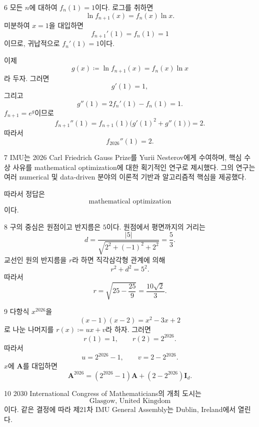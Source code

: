 \documentclass[11pt,oneside]{article}
\begin{document}
\begin{problemsolution}{6}
모든 $n$에 대하여 $f_n(1)=1$이다. 로그를 취하면
\[
    \ln f_{n+1}(x)=f_n(x)\ln x.
\]
미분하여 $x=1$을 대입하면
\[
    f_{n+1}'(1)=f_n(1)=1
\]
이므로, 귀납적으로 $f_n'(1)=1$이다.

이제
\[
    g(x)\coloneqq \ln f_{n+1}(x)=f_n(x)\ln x
\]
라 두자. 그러면
\[
    g'(1)=1,
\]
그리고
\[
    g''(1)
    =
    2f_n'(1)-f_n(1)
    =1.
\]
$f_{n+1}=e^g$이므로
\[
    f_{n+1}''(1)
    =
    f_{n+1}(1)\bigl(g'(1)^2+g''(1)\bigr)
    =2.
\]
따라서
\[
    \boxed{f_{2026}''(1)=2}.
\]
\end{problemsolution}

\begin{problemsolution}{7}
IMU는 2026 Carl Friedrich Gauss Prize를 Yurii Nesterov에게 수여하며, 핵심 수상 사유를 mathematical optimization에 대한 획기적인 연구로 제시했다. 그의 연구는 여러 numerical 및 data-driven 분야의 이론적 기반과 알고리즘적 핵심을 제공했다.

따라서 정답은
\[
    \boxed{\text{mathematical optimization}}
\]
이다.
\end{problemsolution}

\begin{problemsolution}{8}
구의 중심은 원점이고 반지름은 $5$이다. 원점에서 평면까지의 거리는
\[
    d
    =
    \frac{|5|}{\sqrt{2^2+(-1)^2+2^2}}
    =
    \frac{5}{3}.
\]
교선인 원의 반지름을 $r$라 하면 직각삼각형 관계에 의해
\[
    r^2+d^2=5^2.
\]
따라서
\[
    r
    =
    \sqrt{25-\frac{25}{9}}
    =
    \boxed{\frac{10\sqrt2}{3}}.
\]
\end{problemsolution}

\begin{problemsolution}{9}
다항식 $x^{2026}$을
\[
    (x-1)(x-2)=x^2-3x+2
\]
로 나눈 나머지를 $r(x)\coloneqq ux+v$라 하자. 그러면
\[
    r(1)=1,
    \qquad
    r(2)=2^{2026}.
\]
따라서
\[
    u=2^{2026}-1,
    \qquad
    v=2-2^{2026}.
\]
$x$에 $\mathbf{A}$를 대입하면
\[
    \boxed{
        \mathbf{A}^{2026}
        =
        (2^{2026}-1)\mathbf{A}
        +(2-2^{2026})\mathbf{I}_d
    }.
\]
\end{problemsolution}

\begin{problemsolution}{10}
2030 International Congress of Mathematicians의 개최 도시는
\[
    \boxed{\text{Glasgow, United Kingdom}}
\]
이다. 같은 결정에 따라 제21차 IMU General Assembly는 Dublin, Ireland에서 열린다.
\end{problemsolution}
\end{document}
